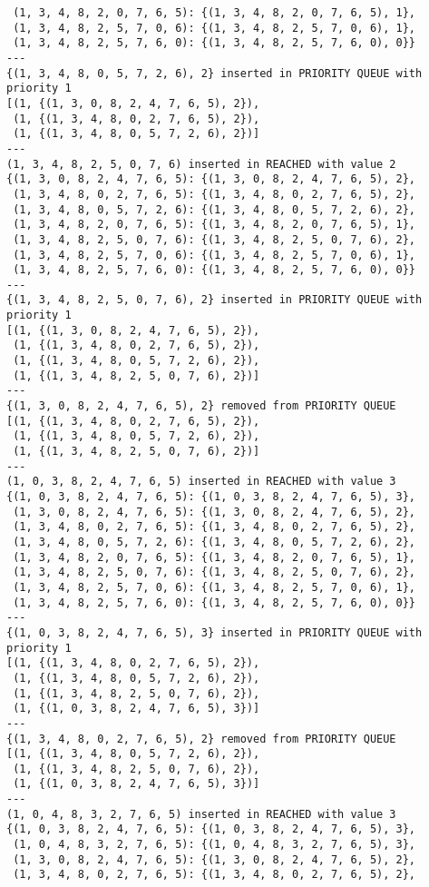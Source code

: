 \documentclass{article}
\begin{document}
\begin{verbatim}
 (1, 3, 4, 8, 2, 0, 7, 6, 5): {(1, 3, 4, 8, 2, 0, 7, 6, 5), 1},
 (1, 3, 4, 8, 2, 5, 7, 0, 6): {(1, 3, 4, 8, 2, 5, 7, 0, 6), 1},
 (1, 3, 4, 8, 2, 5, 7, 6, 0): {(1, 3, 4, 8, 2, 5, 7, 6, 0), 0}}
---
{(1, 3, 4, 8, 0, 5, 7, 2, 6), 2} inserted in PRIORITY QUEUE with priority 1
[(1, {(1, 3, 0, 8, 2, 4, 7, 6, 5), 2}),
 (1, {(1, 3, 4, 8, 0, 2, 7, 6, 5), 2}),
 (1, {(1, 3, 4, 8, 0, 5, 7, 2, 6), 2})]
---
(1, 3, 4, 8, 2, 5, 0, 7, 6) inserted in REACHED with value 2
{(1, 3, 0, 8, 2, 4, 7, 6, 5): {(1, 3, 0, 8, 2, 4, 7, 6, 5), 2},
 (1, 3, 4, 8, 0, 2, 7, 6, 5): {(1, 3, 4, 8, 0, 2, 7, 6, 5), 2},
 (1, 3, 4, 8, 0, 5, 7, 2, 6): {(1, 3, 4, 8, 0, 5, 7, 2, 6), 2},
 (1, 3, 4, 8, 2, 0, 7, 6, 5): {(1, 3, 4, 8, 2, 0, 7, 6, 5), 1},
 (1, 3, 4, 8, 2, 5, 0, 7, 6): {(1, 3, 4, 8, 2, 5, 0, 7, 6), 2},
 (1, 3, 4, 8, 2, 5, 7, 0, 6): {(1, 3, 4, 8, 2, 5, 7, 0, 6), 1},
 (1, 3, 4, 8, 2, 5, 7, 6, 0): {(1, 3, 4, 8, 2, 5, 7, 6, 0), 0}}
---
{(1, 3, 4, 8, 2, 5, 0, 7, 6), 2} inserted in PRIORITY QUEUE with priority 1
[(1, {(1, 3, 0, 8, 2, 4, 7, 6, 5), 2}),
 (1, {(1, 3, 4, 8, 0, 2, 7, 6, 5), 2}),
 (1, {(1, 3, 4, 8, 0, 5, 7, 2, 6), 2}),
 (1, {(1, 3, 4, 8, 2, 5, 0, 7, 6), 2})]
---
{(1, 3, 0, 8, 2, 4, 7, 6, 5), 2} removed from PRIORITY QUEUE
[(1, {(1, 3, 4, 8, 0, 2, 7, 6, 5), 2}),
 (1, {(1, 3, 4, 8, 0, 5, 7, 2, 6), 2}),
 (1, {(1, 3, 4, 8, 2, 5, 0, 7, 6), 2})]
---
(1, 0, 3, 8, 2, 4, 7, 6, 5) inserted in REACHED with value 3
{(1, 0, 3, 8, 2, 4, 7, 6, 5): {(1, 0, 3, 8, 2, 4, 7, 6, 5), 3},
 (1, 3, 0, 8, 2, 4, 7, 6, 5): {(1, 3, 0, 8, 2, 4, 7, 6, 5), 2},
 (1, 3, 4, 8, 0, 2, 7, 6, 5): {(1, 3, 4, 8, 0, 2, 7, 6, 5), 2},
 (1, 3, 4, 8, 0, 5, 7, 2, 6): {(1, 3, 4, 8, 0, 5, 7, 2, 6), 2},
 (1, 3, 4, 8, 2, 0, 7, 6, 5): {(1, 3, 4, 8, 2, 0, 7, 6, 5), 1},
 (1, 3, 4, 8, 2, 5, 0, 7, 6): {(1, 3, 4, 8, 2, 5, 0, 7, 6), 2},
 (1, 3, 4, 8, 2, 5, 7, 0, 6): {(1, 3, 4, 8, 2, 5, 7, 0, 6), 1},
 (1, 3, 4, 8, 2, 5, 7, 6, 0): {(1, 3, 4, 8, 2, 5, 7, 6, 0), 0}}
---
{(1, 0, 3, 8, 2, 4, 7, 6, 5), 3} inserted in PRIORITY QUEUE with priority 1
[(1, {(1, 3, 4, 8, 0, 2, 7, 6, 5), 2}),
 (1, {(1, 3, 4, 8, 0, 5, 7, 2, 6), 2}),
 (1, {(1, 3, 4, 8, 2, 5, 0, 7, 6), 2}),
 (1, {(1, 0, 3, 8, 2, 4, 7, 6, 5), 3})]
---
{(1, 3, 4, 8, 0, 2, 7, 6, 5), 2} removed from PRIORITY QUEUE
[(1, {(1, 3, 4, 8, 0, 5, 7, 2, 6), 2}),
 (1, {(1, 3, 4, 8, 2, 5, 0, 7, 6), 2}),
 (1, {(1, 0, 3, 8, 2, 4, 7, 6, 5), 3})]
---
(1, 0, 4, 8, 3, 2, 7, 6, 5) inserted in REACHED with value 3
{(1, 0, 3, 8, 2, 4, 7, 6, 5): {(1, 0, 3, 8, 2, 4, 7, 6, 5), 3},
 (1, 0, 4, 8, 3, 2, 7, 6, 5): {(1, 0, 4, 8, 3, 2, 7, 6, 5), 3},
 (1, 3, 0, 8, 2, 4, 7, 6, 5): {(1, 3, 0, 8, 2, 4, 7, 6, 5), 2},
 (1, 3, 4, 8, 0, 2, 7, 6, 5): {(1, 3, 4, 8, 0, 2, 7, 6, 5), 2},

\end{verbatim}
\end{document}
